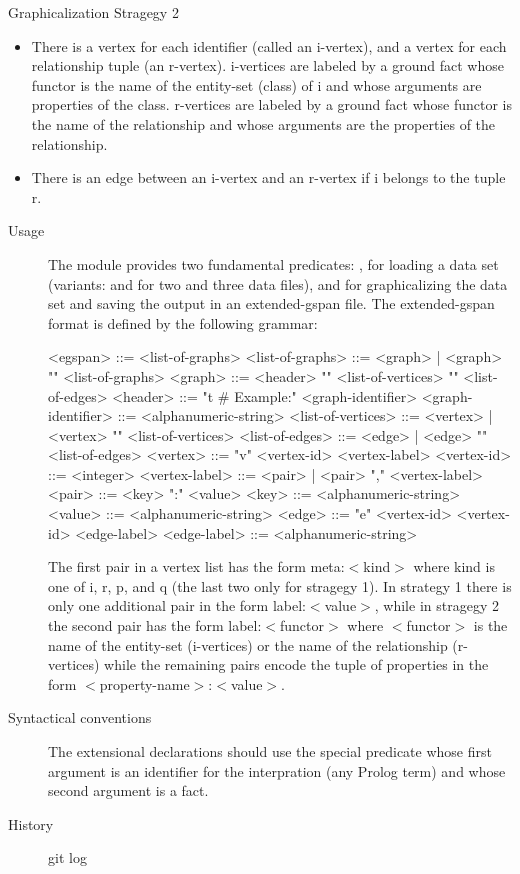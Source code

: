 \documentclass[11pt]{article}
\begin{document}
\begin{description}
    \item[Graphicalization Stragegy 2] 
\end{description}

\begin{itemize}
    \item There is a vertex for each identifier (called an i-vertex), and a
vertex for each relationship tuple (an r-vertex). i-vertices are
labeled by a ground fact whose functor is the name of the entity-set
(class) of i and whose arguments are properties of the
class. r-vertices are labeled by a ground fact whose functor is the
name of the relationship and whose arguments are the properties of
the relationship.
    \item There is an edge between an i-vertex and an r-vertex if i belongs
to the tuple r.
\end{itemize}

\begin{description}
    \item[Usage] 
The module provides two fundamental predicates: , for
loading a data set (variants:  and  for two and
three data files), and  for graphicalizing the data set and
saving the output in an extended-gspan file. The extended-gspan
format is defined by the following grammar:

\begin{code}
<egspan> ::= <list-of-graphs>
<list-of-graphs> ::= <graph> | <graph> "\n" <list-of-graphs>
<graph> ::= <header> "\n" <list-of-vertices> "\n" <list-of-edges>
<header> ::= "t # Example:" <graph-identifier>
<graph-identifier> ::= <alphanumeric-string>
<list-of-vertices> ::= <vertex> | <vertex> "\n" <list-of-vertices>
<list-of-edges> ::= <edge> | <edge> "\n" <list-of-edges>
<vertex> ::= "v" <vertex-id> <vertex-label>
<vertex-id> ::= <integer>
<vertex-label> ::= <pair> | <pair> "," <vertex-label>
<pair> ::= <key> ":" <value>
<key> ::= <alphanumeric-string>
<value> ::= <alphanumeric-string>
<edge> ::= "e" <vertex-id> <vertex-id> <edge-label>
<edge-label> ::= <alphanumeric-string>
\end{code}

The first pair in a vertex list has the form meta:$<$kind$>$ where kind
is one of i, r, p, and q (the last two only for stragegy 1). In
strategy 1 there is only one additional pair in the form
label:$<$value$>$, while in stragegy 2 the second pair has the form
label:$<$functor$>$ where $<$functor$>$ is the name of the entity-set
(i-vertices) or the name of the relationship (r-vertices) while the
remaining pairs encode the tuple of properties in the form
$<$property-name$>$:$<$value$>$.
    \item[Syntactical conventions] 
The extensional declarations should use the special predicate
 whose first argument is an identifier for the
interpration (any Prolog term) and whose second argument is a fact.
    \item[History] 
git log
\end{description}
\end{document}
